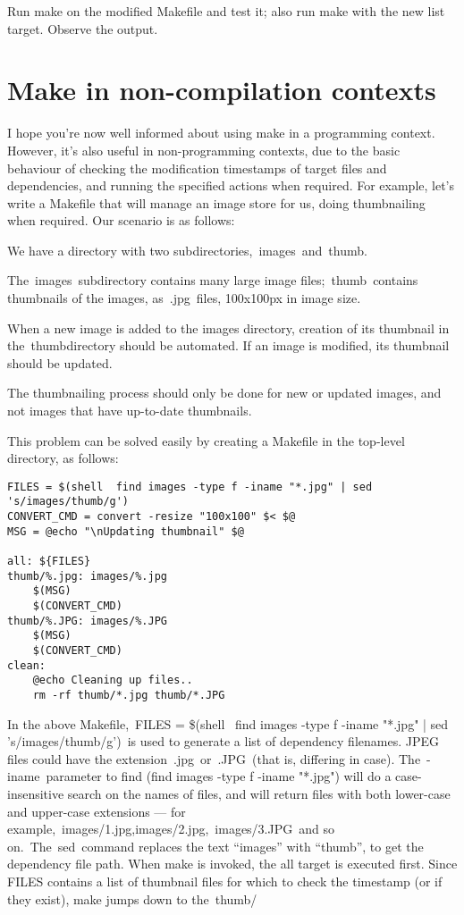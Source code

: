 \documentclass[12pt]{article}
\begin{document}
Run make on the modified Makefile and test it; also run make with the new list target. Observe the output.

\section *{Make in non-compilation contexts}

I hope you’re now well informed about using make in a programming context. However, it’s also useful in non-programming contexts, due to the basic behaviour of checking the modification timestamps of target files and dependencies, and running the specified actions when required. For example, let’s write a Makefile that will manage an image store for us, doing thumbnailing when required. Our scenario is as follows:

We have a directory with two subdirectories, images and thumb.

The images subdirectory contains many large image files; thumb contains thumbnails of the images, as .jpg files, 100x100px in image size.

When a new image is added to the images directory, creation of its thumbnail in the thumbdirectory should be automated. If an image is modified, its thumbnail should be updated.

The thumbnailing process should only be done for new or updated images, and not images that have up-to-date thumbnails.

This problem can be solved easily by creating a Makefile in the top-level directory, as follows:

\begin{verbatim}
FILES = $(shell  find images -type f -iname "*.jpg" | sed 's/images/thumb/g')
CONVERT_CMD = convert -resize "100x100" $< $@
MSG = @echo "\nUpdating thumbnail" $@
 
all: ${FILES}
thumb/%.jpg: images/%.jpg
    $(MSG)
    $(CONVERT_CMD)
thumb/%.JPG: images/%.JPG
    $(MSG)
    $(CONVERT_CMD)
clean:
    @echo Cleaning up files..
    rm -rf thumb/*.jpg thumb/*.JPG
\end{verbatim}

In the above Makefile, FILES = \$(shell  find images -type f -iname "*.jpg" | sed 's/images/thumb/g') is used to generate a list of dependency filenames. JPEG files could have the extension .jpg or .JPG (that is, differing in case). The -iname parameter to find (find images -type f -iname "*.jpg") will do a case-insensitive search on the names of files, and will return files with both lower-case and upper-case extensions — for example, images/1.jpg,images/2.jpg, images/3.JPG and so on. The sed command replaces the text “images” with “thumb”, to get the dependency file path.
When make is invoked, the all target is executed first. Since FILES contains a list of thumbnail files for which to check the timestamp (or if they exist), make jumps down to the thumb/%
\end{document}
